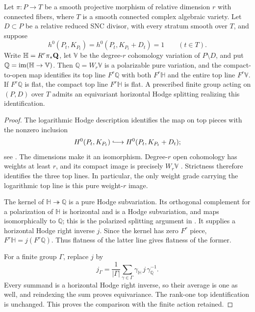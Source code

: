\begin{lemma}
\label{ordinary:compact-open}
Let $\pi:P\to T$ be a smooth projective morphism of relative
dimension $r$ with connected fibers, where $T$ is a smooth connected
complex algebraic variety. Let $D\subset P$ be a relative reduced
SNC divisor, with every stratum smooth over $T$, and suppose
\[
 h^0(P_t,K_{P_t})=h^0(P_t,K_{P_t}+D_t)=1
 \qquad(t\in T).
\]
Write $\mathbb H=R^r\pi_*\mathbf Q$, let $\mathbb V$ be the
degree-$r$ cohomology variation of $P\setminus D$, and put
$\mathbb Q=\operatorname{im}(\mathbb H\to\mathbb V)$.
Then $\mathbb Q=W_r\mathbb V$ is a polarizable pure variation,
and the compact-to-open map identifies its top line $F^r\mathbb Q$
with both $F^r\mathbb H$ and the entire top line $F^r\mathbb V$.
If $F^r\mathbb Q$ is flat, the compact top line $F^r\mathbb H$
is flat. A prescribed finite group acting on $(P,D)$ over $T$
admits an equivariant horizontal Hodge splitting realizing this
identification.
\end{lemma}

\begin{proof}
The logarithmic Hodge description identifies the map on top pieces
with the nonzero inclusion
\[
 H^0(P_t,K_{P_t})\lhook\joinrel\longrightarrow
 H^0(P_t,K_{P_t}+D_t);
\]
see \cite[Corollaries~3.2.13(ii) and~3.2.14]{Deligne71}.
The dimensions make it an isomorphism. Degree-$r$ open cohomology
has weights at least $r$, and its compact image is precisely
$W_r\mathbb V$ \cite[Corollary~3.2.17]{Deligne71}.
Strictness therefore identifies the three top lines. In particular,
the only weight grade carrying the logarithmic top line is this
pure weight-$r$ image.

The kernel of $\mathbb H\twoheadrightarrow\mathbb Q$ is a
pure Hodge subvariation. Its orthogonal complement for a
polarization of $\mathbb H$ is horizontal and is a Hodge
subvariation, and maps isomorphically to $\mathbb Q$; this is
the polarized splitting argument in \cite[Lemma~4.2.3(i)]{Deligne71}.
It supplies a horizontal Hodge right inverse $j$. Since the
kernel has zero $F^r$ piece, $F^r\mathbb H=j(F^r\mathbb Q)$.
Thus flatness of the latter line gives flatness of the former.

For a finite group $\Gamma$, replace $j$ by
\[
 j_\Gamma=\frac1{|\Gamma|}\sum_{\gamma\in\Gamma}
       \gamma_{\mathbb H}\,j\,\gamma_{\mathbb Q}^{-1}.
\]
Every summand is a horizontal Hodge right inverse, so their
average is one as well, and reindexing the sum proves equivariance.
The rank-one top identification is unchanged. This proves the
comparison with the finite action retained.
\end{proof}
